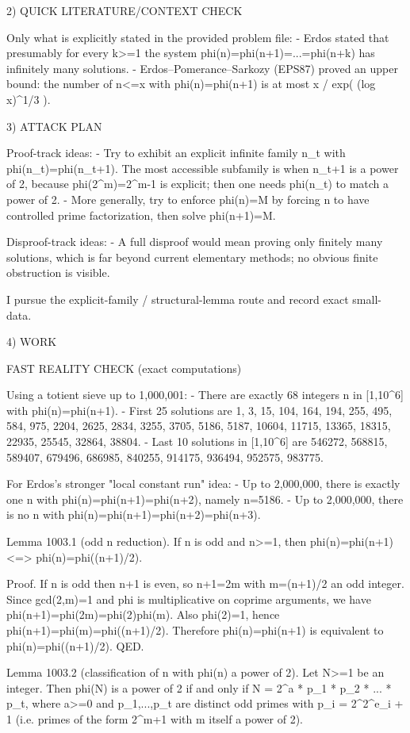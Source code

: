 2) QUICK LITERATURE/CONTEXT CHECK

Only what is explicitly stated in the provided problem file:
- Erdos stated that presumably for every k>=1 the system phi(n)=phi(n+1)=...=phi(n+k) has infinitely many solutions.
- Erdos--Pomerance--Sarkozy (EPS87) proved an upper bound: the number of n<=x with phi(n)=phi(n+1) is at most
  x / exp( (log x)^{1/3} ).

3) ATTACK PLAN

Proof-track ideas:
- Try to exhibit an explicit infinite family n_t with phi(n_t)=phi(n_t+1). The most accessible subfamily is when n_t+1 is a power of 2, because phi(2^m)=2^{m-1} is explicit; then one needs phi(n_t) to match a power of 2.
- More generally, try to enforce phi(n)=M by forcing n to have controlled prime factorization, then solve phi(n+1)=M.

Disproof-track ideas:
- A full disproof would mean proving only finitely many solutions, which is far beyond current elementary methods; no obvious finite obstruction is visible.

I pursue the explicit-family / structural-lemma route and record exact small-data.

4) WORK

FAST REALITY CHECK (exact computations)

Using a totient sieve up to 1,000,001:
- There are exactly 68 integers n in [1,10^6] with phi(n)=phi(n+1).
- First 25 solutions are
  1, 3, 15, 104, 164, 194, 255, 495, 584, 975, 2204, 2625, 2834, 3255, 3705, 5186, 5187,
  10604, 11715, 13365, 18315, 22935, 25545, 32864, 38804.
- Last 10 solutions in [1,10^6] are
  546272, 568815, 589407, 679496, 686985, 840255, 914175, 936494, 952575, 983775.

For Erdos's stronger "local constant run" idea:
- Up to 2,000,000, there is exactly one n with phi(n)=phi(n+1)=phi(n+2), namely n=5186.
- Up to 2,000,000, there is no n with phi(n)=phi(n+1)=phi(n+2)=phi(n+3).

Lemma 1003.1 (odd n reduction).
If n is odd and n>=1, then
  phi(n)=phi(n+1)  <=>  phi(n)=phi((n+1)/2).

Proof.
If n is odd then n+1 is even, so n+1=2m with m=(n+1)/2 an odd integer.
Since gcd(2,m)=1 and phi is multiplicative on coprime arguments, we have
  phi(n+1)=phi(2m)=phi(2)phi(m).
Also phi(2)=1, hence phi(n+1)=phi(m)=phi((n+1)/2).
Therefore phi(n)=phi(n+1) is equivalent to phi(n)=phi((n+1)/2).  QED.

Lemma 1003.2 (classification of n with phi(n) a power of 2).
Let N>=1 be an integer. Then phi(N) is a power of 2 if and only if
  N = 2^a * p_1 * p_2 * ... * p_t,
where a>=0 and p_1,...,p_t are distinct odd primes with p_i = 2^{2^{e_i}} + 1 (i.e. primes of the form 2^m+1 with m itself a power of 2).

